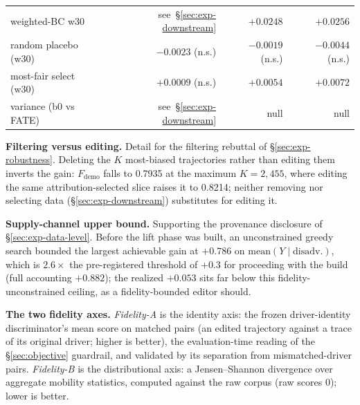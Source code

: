 \begin{table}[t]
\begin{tabular}{lrrr}
weighted-BC w30 & see~\S\ref{sec:exp-downstream} & $+0.0248$ & $+0.0256$ \\
\quad random placebo (w30) & $-0.0023$ (n.s.) & $-0.0019$ (n.s.) & $-0.0044$ (n.s.) \\
\quad most-fair select (w30) & $+0.0009$ (n.s.) & $+0.0054$ & $+0.0072$ \\
variance (b0 vs FATE) & see~\S\ref{sec:exp-downstream} & null & null \\ %
\bottomrule
\end{tabular}
\end{table}

\textbf{Filtering versus editing.} Detail for the filtering rebuttal of
\S\ref{sec:exp-robustness}. Deleting the $K$ most-biased trajectories rather
than editing them inverts the gain: $F_{\mathrm{demo}}$ falls to 0.7935 at the
maximum $K = 2{,}455$, where editing the same attribution-selected slice
raises it to 0.8214; neither removing nor selecting data
(\S\ref{sec:exp-downstream}) substitutes for editing it.

\textbf{Supply-channel upper bound.} Supporting the provenance disclosure of
\S\ref{sec:exp-data-level}. Before the lift phase was built, an unconstrained
greedy search bounded the largest achievable gain at $+0.786$ on
$\mathrm{mean}(Y \mid \mathrm{disadv.})$, which is $2.6\times$ the
pre-registered threshold of $+0.3$ for proceeding with the build (full
accounting $+0.882$); the realized $+0.053$ sits far below this
fidelity-unconstrained ceiling, as a fidelity-bounded editor should.

\textbf{The two fidelity axes.} \emph{Fidelity-A} is the identity axis: the
frozen driver-identity discriminator's mean score on matched pairs (an
edited trajectory against a trace of its original driver; higher is
better), the evaluation-time reading of the \S\ref{sec:objective}
guardrail, and validated by its separation from mismatched-driver pairs.
\emph{Fidelity-B} is the distributional axis: a Jensen--Shannon divergence
over aggregate mobility statistics, computed against the raw corpus (raw
scores 0); lower is better.


